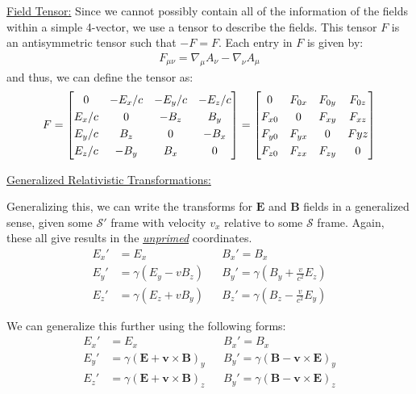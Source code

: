 \documentclass{article}
\newcommand{\sheader}[1]{\underline{#1:}}
\begin{document}
\sheader{Field Tensor} Since we cannot possibly contain all of the 
information of the fields within a simple 4-vector, we use a tensor to 
describe the fields. This tensor $F$ is an antisymmetric tensor 
such that $-F = F$. Each entry in $F$ is given by:
\begin{align*}
    F_{\mu\nu} = \nabla_\mu A_\nu - \nabla_\nu A_\mu
\end{align*}
and thus, we can define the tensor as:
\begin{align*}
    F = 
    \renewcommand{\arraystretch}{1.25}
    \begin{bmatrix}
        0 & -E_x / c & -E_y/c & -E_z/c \\
        E_x/c & 0 & -B_z & B_y\\
        E_y/c & B_z & 0 & -B_x\\
        E_z/c & -B_y & B_x & 0
    \end{bmatrix} = 
    \begin{bmatrix}
        0 & F_{0x} & F_{0y} & F_{0z} \\
        F_{x0} & 0 & F_{xy} & F_{xz}\\
        F_{y0} & F_{yx} & 0 & F{yz}\\
        F_{z0} & F_{zx} & F_{zy} & 0
    \end{bmatrix}
\end{align*}
\pagebreak

\sheader{Generalized Relativistic Transformations}

Generalizing this, we can write the transforms for $\mathbf{E}$ and $\mathbf{B}$ fields in a generalized sense, given some 
$\mathcal{S}'$ frame with velocity $v_x$ relative to some $\mathcal{S}$ frame.
Again, these all give results in the \underline{\textit{unprimed}} coordinates.
\begin{align*}
    E_x' &= E_x && B_x' = B_x\\
    E_y' &= \gamma(E_y - v B_z) && B_y' = \gamma\left(B_y + \frac{v}{c^2} E_z\right)\\
    E_z' &= \gamma(E_z + vB_y) && B_z' = \gamma\left(B_z - \frac{v}{c^2} E_y\right)
\end{align*}

We can generalize this further using the following forms:
\begin{align*}
    E_x' &= E_x && B_x' = B_x\\
    E_y' &= \gamma (\mathbf{E} + \mathbf{v} \times \mathbf{B})_y && B_y' = \gamma (\mathbf{B} - \mathbf{v} \times \mathbf{E})_y\\
    E_z' &= \gamma (\mathbf{E} + \mathbf{v} \times \mathbf{B})_z && B_y' = \gamma (\mathbf{B} - \mathbf{v} \times \mathbf{E})_z
\end{align*}
\end{document}
